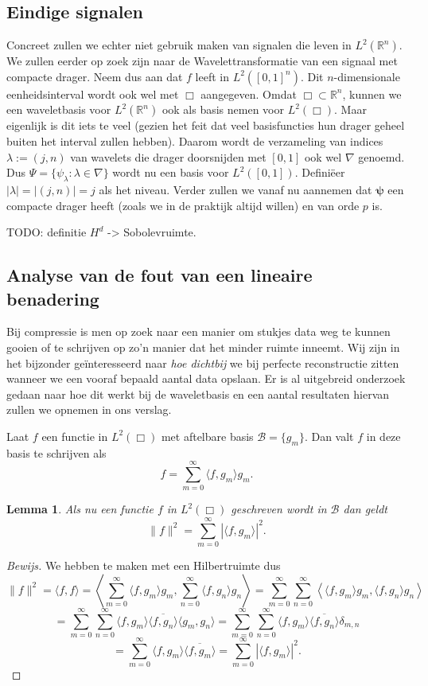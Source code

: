 \documentclass[11pt]{report}
\theoremstyle{plain}
\newtheorem{lemma}{Lemma}
\theoremstyle{definition}
\theoremstyle{remark}
\newcommand{\R}{\mathbb{R}}
\begin{document}
\subsection{Eindige signalen}
Concreet zullen we echter niet gebruik maken van signalen die leven in $L^2(\R^n)$. We zullen eerder op zoek zijn naar de Wavelettransformatie van een signaal met compacte drager. Neem dus aan dat $f$ leeft in $L^2([0,1]^n)$. Dit $n$-dimensionale eenheidsinterval wordt ook wel met $\Box$ aangegeven. Omdat $\Box \subset \R^n$, kunnen we een waveletbasis voor $L^2(\R^n)$ ook als basis nemen voor $L^2(\Box)$. Maar eigenlijk is dit iets te veel (gezien het feit dat veel basisfuncties hun drager geheel buiten het interval zullen hebben). Daarom wordt de verzameling van indices $\lambda := (j,n)$ van wavelets die drager doorsnijden met $[0,1]$ ook wel $\nabla$ genoemd. Dus $\Psi = \{ \psi_\lambda: \lambda \in \nabla \}$ wordt nu een basis voor $L^2([0,1])$. Defini\"eer $|\lambda| = |(j,n)| = j$ als het niveau.
Verder zullen we vanaf nu aannemen dat $\boldsymbol\psi$ een compacte drager heeft (zoals we in de praktijk altijd willen) en van orde $p$ is.

TODO: definitie $H^d$ -> Sobolevruimte.

\subsection{Analyse van de fout van een lineaire benadering}
Bij compressie is men op zoek naar een manier om stukjes data weg te kunnen gooien of te schrijven op zo'n manier dat het minder ruimte inneemt. Wij zijn in het bijzonder ge\"interesseerd naar \emph{hoe dichtbij} we bij perfecte reconstructie zitten wanneer we een vooraf bepaald aantal data opslaan. Er is al uitgebreid onderzoek gedaan naar hoe dit werkt bij de waveletbasis en een aantal resultaten hiervan zullen we opnemen in ons verslag.

Laat $f$ een functie in $L^2(\Box)$ met aftelbare basis $\mathcal{B} = \{ g_m \}$. Dan valt $f$ in deze basis te schrijven als
\[
	f = \sum_{m = 0}^\infty \langle f, g_m \rangle g_m.
\]

\begin{lemma}
Als nu een functie $f$ in $L^2(\Box)$ geschreven wordt in $\mathcal{B}$ dan geldt
\[
	\|f\|^2 = \sum_{m=0}^\infty | \langle f, g_m \rangle |^2.
\]
\end{lemma}
\begin{proof}[Bewijs]
We hebben te maken met een Hilbertruimte dus
\[
\|f\|^2 = \langle f, f \rangle = \left\langle \sum_{m=0}^\infty \langle f, g_m \rangle g_m, \sum_{n=0}^\infty \langle f, g_n \rangle g_n \right\rangle = \sum_{m=0}^\infty \sum_{n=0}^\infty \left\langle \langle f, g_m \rangle g_m, \langle f, g_n \rangle g_n \right \rangle
\]
\[
 = \sum_{m=0}^\infty \sum_{n=0}^\infty \langle f, g_m \rangle \overline{\langle f, g_n \rangle}\langle g_m, g_n \rangle = \sum_{m=0}^\infty \sum_{n=0}^\infty \langle f, g_m \rangle \overline{\langle f, g_n \rangle} \delta_{m,n} 
\]
\[ = \sum_{m=0}^\infty \langle f, g_m \rangle \overline{\langle f, g_m \rangle} = \sum_{m=0}^\infty |\langle f, g_m \rangle |^2.
\]
\end{proof}
\end{document}
